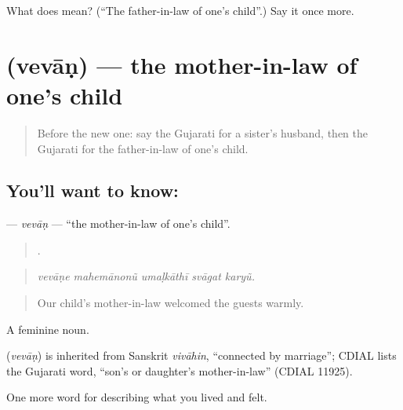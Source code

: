 \begin{tcolorbox}[breakable,colback=teal!4,colframe=teal!35!black,title={Before you move on}]
What does  mean? (\textquotedblleft{}The father-in-law of one's child\textquotedblright{}.) Say it once more.
\end{tcolorbox}
\section[\texorpdfstring{\gu{વેવાણ} (vevāṇ)}{વેવાણ (vevāṇ)}]{ (vevāṇ) — the mother-in-law of one's child}

\label{lesson:GU-C491-vevan}



\begin{quote}
Before the new one: say the Gujarati for a sister's husband, then the Gujarati for the father-in-law of one's child.
\end{quote}

\subsection*{You'll want to know: }
\textbf{} — \emph{vevāṇ} — \textquotedblleft{}the mother-in-law of one's child\textquotedblright{}.

\begin{quote}
    .
\end{quote}

\begin{quote}
\emph{vevāṇe mahemānonũ umaḷkāthī svāgat karyũ.}
\end{quote}

\begin{quote}
Our child's mother-in-law welcomed the guests warmly.
\end{quote}

A feminine noun.

\begin{cousinweb}
\textbf{} (\emph{vevāṇ}) is inherited from Sanskrit \emph{vivāhin}, \textquotedblleft{}connected by marriage\textquotedblright{}; CDIAL lists the Gujarati word, \textquotedblleft{}son's or daughter's mother-in-law\textquotedblright{} (CDIAL 11925).
\end{cousinweb}

\begin{grammarlens}[title={What you've built}]
One more word for describing what you lived and felt.
\end{grammarlens}

